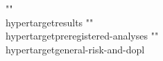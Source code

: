 {{{{{{{{{{{{{""\\hypertarget{results}{%
""\\hypertarget{preregistered-analyses}{%
""\\hypertarget{general-risk-and-dopl}{%
}}}}}}}}}}}}}}}}
